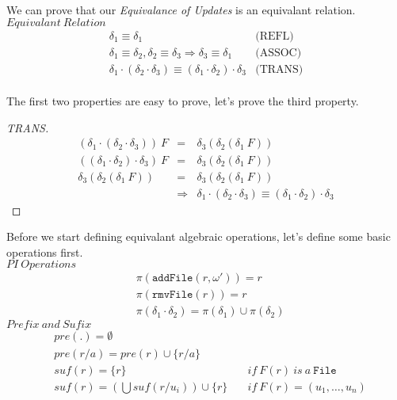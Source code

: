 \documentclass[10pt,twoside,a4paper]{article}
\theoremstyle{theorem}
\theoremstyle{lemma}
\theoremstyle{property}
\theoremstyle{definition}
\theoremstyle{assumption}
\begin{document}
We can prove that our \emph{Equivalance of Updates} is an equivalant relation.\\

$\boxed{Equivalant~Relation}$
\begin{displaymath}
\begin{array}{ll}
	\delta_1 \equiv \delta_1 & \textrm{(REFL)} \\
	\delta_1 \equiv \delta_2, \delta_2 \equiv \delta_3 \Rightarrow \delta_3 \equiv \delta_1 & \textrm{(ASSOC)} \\
	\delta_1 \cdot (\delta_2 \cdot \delta_3) \equiv (\delta_1 \cdot \delta_2) \cdot \delta_3 & \textrm{(TRANS)}
\end{array}
\end{displaymath}\\

The first two properties are easy to prove, let's prove the third property.

\begin{proof}[TRANS]

\begin{eqnarray*}
	(\delta_1 \cdot (\delta_2 \cdot \delta_3)) ~F & = & \delta_3 (\delta_2 (\delta_1 ~F)) \\
	((\delta_1 \cdot \delta_2) \cdot \delta_3) ~F & = & \delta_3 (\delta_2 (\delta_1 ~F)) \\
	\delta_3 (\delta_2 (\delta_1 ~F)) & = & \delta_3 (\delta_2 (\delta_1 ~F)) \\
	& \Rightarrow & \delta_1 \cdot (\delta_2 \cdot \delta_3) \equiv (\delta_1 \cdot \delta_2) \cdot \delta_3
\end{eqnarray*}
\end{proof}

Before we start defining equivalant algebraic operations, let's define some basic operations first.\\

$\boxed{PI~Operations}$
\begin{align*}
	& \pi(\mathtt{addFile}(r,\omega')) = r\\
	& \pi(\mathtt{rmvFile}(r)) = r\\
	& \pi(\delta_1 \cdot \delta_2) = \pi(\delta_1) \cup \pi(\delta_2)
\end{align*}
$\boxed{Prefix ~ and ~ Sufix}$
\begin{align*}
	& pre(.) = \emptyset\\
	& pre(r/a) = pre(r) \cup \{r/a\}\\
	& suf(r) = \{r\} \quad & if~F(r)~is~a~\mathtt{File}\\
	& suf(r) = (\bigcup suf(r/u_i)) \cup \{r\} \quad & if~F(r) = (u_1,\dots,u_n)
\end{align*}
\end{document}
